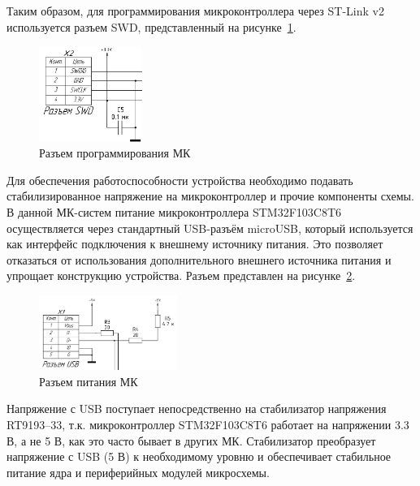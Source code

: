 Таким образом, для программирования микроконтроллера через ST-Link v2 используется разъем SWD, представленный на рисунке~\ref{fig:swd}.

\begin{figure}[H]
    \centering
    \includegraphics[width=0.3\textwidth]{images/design/swd}
    \caption{\centering Разъем программирования МК}
    \label{fig:swd}
\end{figure}


Для обеспечения работоспособности устройства необходимо подавать стабилизированное напряжение на микроконтроллер и прочие компоненты схемы.
В данной МК-систем питание микроконтроллера STM32F103C8T6 осуществляется через стандартный USB-разъём microUSB, который используется как интерфейс подключения к внешнему источнику питания.
Это позволяет отказаться от использования дополнительного внешнего источника питания и упрощает конструкцию устройства.
Разъем представлен на рисунке~\ref{fig:usb}.

\begin{figure}[H]
    \centering
    \includegraphics[width=0.4\textwidth]{images/design/usb}
    \caption{\centering Разъем питания МК}
    \label{fig:usb}
\end{figure}

Напряжение с USB поступает непосредственно на стабилизатор напряжения RT9193--33, т.к. микроконтроллер STM32F103C8T6 работает на напряжении 3.3 В, а не 5 В, как это часто бывает в других МК.
Стабилизатор преобразует напряжение с USB (5 В) к необходимому уровню и обеспечивает стабильное питание ядра и периферийных модулей микросхемы.

